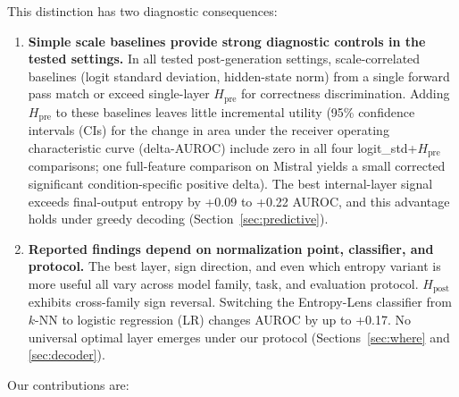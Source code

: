 \documentclass{ieeeaccess}
\newcommand{\Hpre}{H_{\text{pre}}}
\newcommand{\Hpost}{H_{\text{post}}}
\begin{document}
This distinction has two diagnostic consequences:

\begin{enumerate}
\item \textbf{Simple scale baselines provide strong diagnostic controls in the tested settings.} In all tested post-generation settings, scale-correlated baselines (logit standard deviation, hidden-state norm) from a single forward pass match or exceed single-layer $\Hpre$ for correctness discrimination. Adding $\Hpre$ to these baselines leaves little incremental utility (95\% confidence intervals (CIs) for the change in area under the receiver operating characteristic curve (delta-AUROC) include zero in all four logit\_std+$\Hpre$ comparisons; one full-feature comparison on Mistral yields a small corrected significant condition-specific positive delta). The best internal-layer signal exceeds final-output entropy by +0.09 to +0.22 AUROC, and this advantage holds under greedy decoding (Section~\ref{sec:predictive}).

\item \textbf{Reported findings depend on normalization point, classifier, and protocol.} The best layer, sign direction, and even which entropy variant is more useful all vary across model family, task, and evaluation protocol. $\Hpost$ exhibits cross-family sign reversal. Switching the Entropy-Lens classifier from $k$-NN to logistic regression (LR) changes AUROC by up to +0.17. No universal optimal layer emerges under our protocol (Sections~\ref{sec:where} and \ref{sec:decoder}).
\end{enumerate}

Our contributions are:
\end{document}
